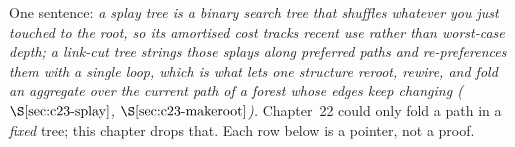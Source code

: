 

One sentence: \emph{a splay tree is a binary search tree that shuffles whatever you
just touched to the root, so its \emph{amortised} cost tracks recent use rather than
worst-case depth; a link-cut tree strings those splays along \emph{preferred paths}
and re-preferences them with a single  loop, which is what lets one
structure reroot, rewire, and fold an aggregate over the current path of a forest
whose edges keep changing (\(\secref{c23-splay}\), \(\secref{c23-makeroot}\)).}
Chapter~22 could only fold a path in a \emph{fixed} tree; this chapter drops that.
Each row below is a pointer, not a proof.

